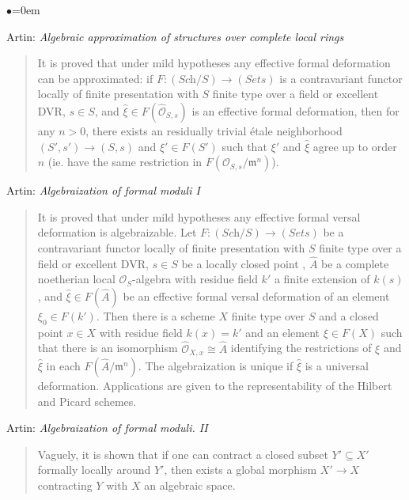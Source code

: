 \begin{list}{$\bullet$}{\leftmargin=0em}
\item Artin: \emph{Algebraic approximation of structures over 
complete local rings} \cite{artin_approximation}
\begin{quote}
It is proved that under mild hypotheses any effective formal deformation can be 
approximated: if $F: (\textit{Sch}/S) \to (\textit{Sets})$
is a contravariant functor 
locally of finite presentation with $S$ finite type over a field or excellent 
DVR, $s \in S$, and $\hat{\xi} \in F(\hat{\mathcal{O}}_{S,s})$ is an effective 
formal 
deformation, then for any $n > 0$, there exists an residually trivial \'etale 
neighborhood $(S',s') \to (S,s)$ and $\xi' \in F(S')$ such that $\xi'$ and 
$\hat{\xi}$ agree up to order $n$ (ie. have the same restriction in
$F(\mathcal{O}_{S,s} / \mathfrak m^n)$).
\end{quote}
\smallskip
\item
Artin: \emph{Algebraization of formal moduli I} \cite{artin_algebraizationI}
\begin{quote}
It is proved that under mild hypotheses any effective formal versal deformation 
is algebraizable. Let $F: (\textit{Sch}/S) \to (\textit{Sets})$ be a 
contravariant functor 
locally of finite presentation with $S$ finite type over a field or excellent 
DVR, $s \in S$ be a locally closed point , $\hat A$ be a complete noetherian 
local $\mathcal{O}_S$-algebra with residue field $k'$ a finite extension of 
$k(s)$, 
and $\hat{\xi} \in F(\hat A)$ be an effective formal versal deformation of an 
element $\xi_0 \in F(k')$. Then there is a scheme $X$ finite type over $S$ and 
a closed point $x \in X$ with residue field $k(x) = k'$ and an element $\xi \in 
F(X)$ such that there is an isomorphism $\hat{\mathcal{O}}_{X,x} \cong \hat{A}$ 
identifying the restrictions of $\xi$ and $\hat{\xi}$ in each $F(\hat A / 
\mathfrak m^n)$. The algebraization is unique if $\hat{\xi}$ is a universal 
deformation. Applications are given to the representability of the Hilbert
and Picard schemes.
\end{quote}
\smallskip
\item Artin: \emph{Algebraization of formal moduli. II} 
\cite{artin_algebraizationII}
\begin{quote}
Vaguely, it is shown that if one can contract a closed subset $Y' \subseteq X'$ 
formally locally around $Y'$, then exists a global morphism $X' \to X$ 
contracting $Y$ with $X$ an algebraic space. 
\end{quote}

\end{list}
